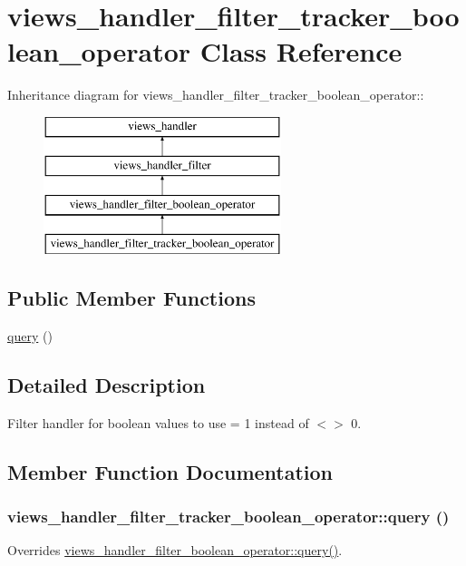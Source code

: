 \hypertarget{classviews__handler__filter__tracker__boolean__operator}{
\section{views\_\-handler\_\-filter\_\-tracker\_\-boolean\_\-operator Class Reference}
\label{classviews__handler__filter__tracker__boolean__operator}
}
Inheritance diagram for views\_\-handler\_\-filter\_\-tracker\_\-boolean\_\-operator::\begin{figure}[H]
\begin{center}
\leavevmode
\includegraphics[height=4cm]{classviews__handler__filter__tracker__boolean__operator}
\end{center}
\end{figure}
\subsection*{Public Member Functions}
\begin{DoxyCompactItemize}
\item 
\hyperlink{classviews__handler__filter__tracker__boolean__operator_aa359173355e1a3094423882ac5af5897}{query} ()
\end{DoxyCompactItemize}


\subsection{Detailed Description}
Filter handler for boolean values to use = 1 instead of $<$$>$ 0. 

\subsection{Member Function Documentation}
\hypertarget{classviews__handler__filter__tracker__boolean__operator_aa359173355e1a3094423882ac5af5897}{
\subsubsection[{query}]{\setlength{\rightskip}{0pt plus 5cm}views\_\-handler\_\-filter\_\-tracker\_\-boolean\_\-operator::query ()}}
\label{classviews__handler__filter__tracker__boolean__operator_aa359173355e1a3094423882ac5af5897}
Overrides \hyperlink{classviews__handler__filter__boolean__operator_ab3afc650701939c060e684d75fa2b21b}{views\_\-handler\_\-filter\_\-boolean\_\-operator::query()}. 

